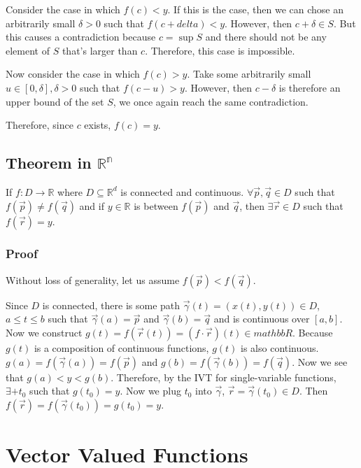 \documentclass[11 pt, twoside]{article}
\begin{document}
Consider the case in which $f(c) < y$. If this is the case, then we can chose an
arbitrarily small $\delta > 0$ such that $f(c + delta) < y$. However, then $c +
\delta \in S$. But this causes a contradiction because $c = \sup S$ and there
should not be any element of $S$ that's larger than $c$. Therefore, this case is
impossible.

Now consider the case in which $f(c) > y$. Take some arbitrarily small $u \in
[0, \delta], \delta > 0$ such that $f(c - u) > y$. However, then $c - \delta$ is
therefore an upper bound of the set $S$, we once again reach the same
contradiction.

Therefore, since $c$ exists, $f(c) = y$.

\subsection{Theorem in $\mathbb{R^n}$}

If $f : D \to \mathbb{R}$ where $D \subseteq \mathbb{R}^d$ is connected
and continuous. $\forall \vec{p}, \vec{q} \in D$ such that $f(\vec{p}) \neq
f(\vec{q})$ and if $y \in \mathbb{R}$ is between $f(\vec{p})$ and $\vec{q}$,
then $\exists \vec{r} \in D$ such that $f(\vec{r}) = y$.

\subsubsection{Proof}

Without loss of generality, let us assume $f(\vec{p}) < f(\vec{q})$.

Since $D$ is connected, there is some path $\vec{\gamma}(t) = (x(t), y(t)) \in
D$, $a \leq t \leq b$ such that $\vec{\gamma}(a) = \vec{p}$ and $\vec{\gamma}(b)
= \vec{q}$ and is continuous over $[a, b]$. Now we construct $g(t) =
f(\vec{r}(t)) = (f\cdot\vec{r})(t) \in mathbb{R}$. Because $g(t)$ is a
composition of continuous functions, $g(t)$ is also continuous. $g(a) =
f(\vec{\gamma}(a)) = f(\vec{p})$ and $g(b) = f(\vec{\gamma}(b)) = f(\vec{q})$.
Now we see that $g(a) < y < g(b)$. Therefore, by the IVT for single-variable
functions, $\exists+t_0$ such that $g(t_0) = y$. Now we plug $t_0$ into
$\vec{\gamma}$, $\vec{r} = \vec{\gamma}(t_0) \in D$. Then $f(\vec{r}) =
f(\vec{\gamma}(t_0)) = g(t_0) = y$.

\section{Vector Valued Functions}
\end{document}
